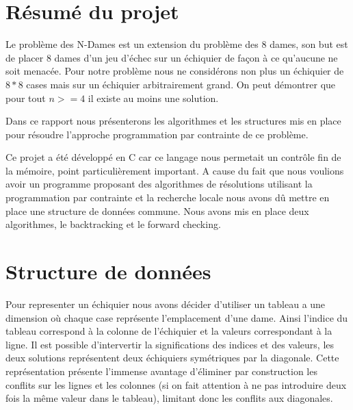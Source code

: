 \documentclass[10pt,a4paper]{report}
\begin{document}


\tableofcontents

\newpage

\section{Résumé du projet}

Le problème des N-Dames est un extension du problème des 8 dames, son but est de placer 8 dames d'un jeu d'échec sur un échiquier de façon à ce qu'aucune ne soit menacée.
Pour notre problème nous ne considérons non plus un échiquier de $8*8$ cases mais sur un échiquier arbitrairement grand. On peut démontrer que pour tout $n >= 4$ il existe au moins une solution.

Dans ce rapport nous présenterons les algorithmes et les structures mis en place pour résoudre l'approche programmation par contrainte de ce problème.

Ce projet a été développé en C car ce langage nous permetait un contrôle fin de la mémoire, point particulièrement important.
A cause du fait que nous voulions avoir un programme proposant des algorithmes de résolutions utilisant la programmation par contrainte et la recherche locale nous avons dû mettre en place une structure de données commune.
Nous avons mis en place deux algorithmes, le backtracking et le forward checking.


\section{Structure de données}

Pour representer un échiquier nous avons décider d'utiliser un tableau a une dimension où chaque case représente l'emplacement d'une dame.
Ainsi l'indice du tableau correspond à la colonne de l'échiquier et la valeurs correspondant à la ligne.
Il est possible d'intervertir la significations des indices et des valeurs, les deux solutions représentent deux échiquiers symétriques par la diagonale.
Cette représentation présente l'immense avantage d'éliminer par construction les conflits sur les lignes et les colonnes (si on fait attention à ne pas introduire deux fois la même valeur dans le tableau),
limitant donc les conflits aux diagonales.
\end{document}
